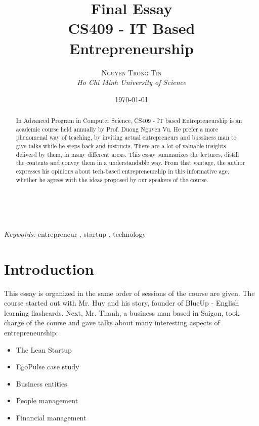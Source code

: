 \documentclass[a4paper, 11pt]{article} %
\title{\textbf{Final Essay}\\ %
CS409 - IT Based Entrepreneurship} %
\author{\textsc{Nguyen Trong Tin} %
\\{\textit{Ho Chi Minh University of Science}}} %
\date{\today} %
\makeatletter
\renewcommand{\maketitle}{ %
\begin{flushright} %
{\LARGE\@title} %

\vspace{50pt} %

{\large\@author} %
\\\@date %

\vspace{40pt} %
\end{flushright}
}
\makeatother
\begin{document}
\maketitle %



\begin{abstract}
In Advanced Program in Computer Science, CS409 - IT based Entrepreneurship is an academic course held annually by Prof. Duong Nguyen Vu. He prefer a more phenomenal way of teaching, by inviting actual entrepreneurs and bussiness man to give talks while he steps back and instructs. There are a lot of valuable insights deliverd by them, in many different areas. This essay summarizes the lectures, distill the contents and convey them in a understandable way. From that vantage, the author expresses his opinions about tech-based entrepreneurship in this informative age, whether he agrees with the ideas proposed by our speakers of the course.
\end{abstract}

\hspace*{3,6mm}\textit{Keywords:} entrepreneur , startup , technology  %

\vspace{30pt} %


\section*{Introduction}
This essay is organized in the same order of sessions of the course are given. The course started out with Mr. Huy and his story, founder of BlueUp - English learning flashcards. Next, Mr. Thanh, a business man based in Saigon, took charge of the course and gave talks about many interesting aspects of entrepreneurship:
\begin{itemize}
\item{The Lean Startup}
\item{EgoPulse case study}
\item{Business entities}
\item{People management}
\item{Financial management}
\end{itemize}
\end{document}
